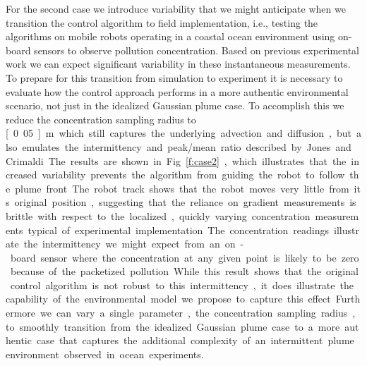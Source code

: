 \documentclass[ letterpaper, 10 pt, conference]{ieeeconf}  %
\begin{document}
For the second case we introduce variability that we might anticipate when we transition the control algorithm to field implementation, i.e., testing the algorithms on mobile robots operating in a coastal ocean environment using on-board sensors to observe pollution concentration.  Based on previous experimental work we can expect significant variability in these instantaneous measurements.  To prepare for this transition from simulation to experiment it is necessary to evaluate how the control approach performs in a more authentic environmental scenario, not just in the idealized Gaussian plume case.   To accomplish this we reduce the concentration sampling radius to \unit[0.05]{m} which still captures the underlying advection and diffusion, but also emulates the intermittency and peak/mean ratio described by Jones and Crimaldi.  The results are shown in Fig.~\ref{f:case2}, which illustrates that the increased variability prevents the algorithm from guiding the robot to follow the plume front. The robot track shows that the robot moves very little from its original position, suggesting that the reliance on gradient measurements is brittle with respect to the localized, quickly varying concentration measurements typical of experimental implementation.  The concentration readings illustrate the intermittency we might expect from an on-board sensor where the concentration at any given point is likely to be zero because of the packetized pollution.  While this result shows that the original control algorithm is not robust to this intermittency, it does illustrate the capability of the environmental model we propose to capture this effect.  Furthermore we can vary a single parameter, the concentration sampling radius, to smoothly transition from the idealized Gaussian plume case to a more authentic case that captures the additional complexity of an intermittent plume environment observed in ocean experiments.
\end{document}
